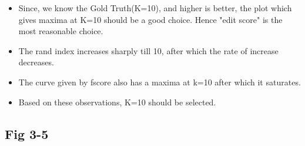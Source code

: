\documentclass{article}
\begin{document}
\begin{itemize}
\item Since, we know the Gold Truth(K=10), and higher is better, the plot which gives maxima at K=10 should be a good choice. Hence "edit score" is the most reasonable choice.
\item The rand index increases sharply till 10, after which the rate of increase decreases.
\item The curve given by fscore also has a maxima at k=10 after which it saturates. 
\item Based on these observations, K=10 should be selected.
\end{itemize}

\subsection{Fig 3-5}
\end{document}
